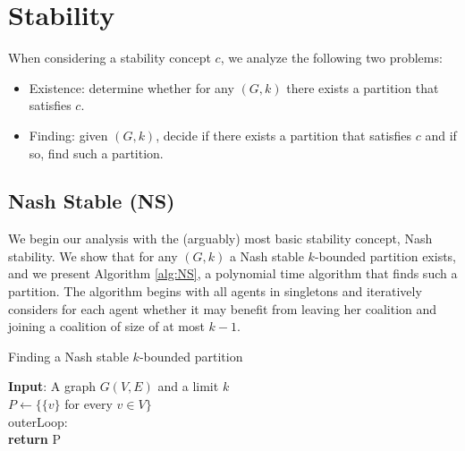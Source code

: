 \documentclass[sigconf,anonymous]{aamas}
\begin{document}
\section{Stability}
When considering a stability concept $c$, we analyze the following two problems:
\begin{itemize}
    \item Existence: determine whether for any $(G,k)$ there exists a partition that satisfies $c$.
    \item Finding: given $(G,k)$, decide if there exists a partition that satisfies $c$ and if so, find such a partition.
\end{itemize}

\subsection{Nash Stable (NS)}

We begin our analysis with the (arguably) most basic stability concept, Nash stability. We show that for any $(G,k)$ a Nash stable $k$-bounded partition exists, and we present Algorithm \ref{alg:NS}, a polynomial time algorithm that finds such a partition. The algorithm begins with all agents in singletons and iteratively considers for each agent whether it may benefit from leaving her coalition and joining a coalition of size of at most $k-1$.

\begin{algorithm}[ht]
    \caption{Finding a Nash stable $k$-bounded partition}
    \label{alg:NS}
    \SetAlgoLined
    \textbf{Input}:
    A graph $G(V,E)$ and a limit $k$\\
    $P \leftarrow \{\{v\}$ for every $v \in V\}$\\
    
    outerLoop:\\ \label{NS:outerLoop} 
        \textbf{return} P
\end{algorithm}
\end{document}
